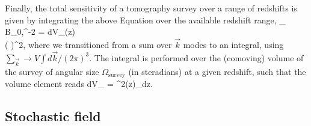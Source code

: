 Finally, the total sensitivity of a tomography survey over a range of redshifts is given by integrating the above Equation over the available redshift range,
\beq
\bga
\sigma_{ B_0,}^{-2} = 
\int dV_\mathrm{}(z)
\\
\times\left(  \right)^2,
\ega
\label{eq:fisher_patch}
\eeq
where we transitioned from a sum over $\vec k$ modes to an integral, using $\sum_{\vec k} \to V\int d\vec k /(2\pi)^3$. 
The integral is performed over the (comoving) volume of the survey of angular size $\Omega_\mathrm{survey}$ (in steradians) at a given redshift, such that the volume element reads
\beq
dV_\mathrm{} = \chi^2(z)\Omega_dz.
\label{eq:dVpatch}
\eeq


\subsection{Stochastic field}
\label{subsec:SI}

